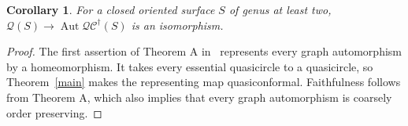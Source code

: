 \documentclass[11pt]{amsart}
\newtheorem{corollary}[theorem]{Corollary}
\begin{document}
\begin{corollary}
For a closed oriented surface \(S\) of genus at least two,
\(\mathcal Q(S)\to\operatorname{Aut}\mathcal{QC}^{\dagger}(S)\)
is an isomorphism.
\end{corollary}
\begin{proof}
The first assertion of Theorem A in~\cite{BNV} represents every
graph automorphism by a homeomorphism. It takes every essential
quasicircle to a quasicircle, so Theorem~\ref{main} makes the
representing map quasiconformal. Faithfulness follows from
Theorem A, which also implies that every graph automorphism
is coarsely order preserving.
\end{proof}


\begingroup\raggedright

\endgroup
\end{document}
